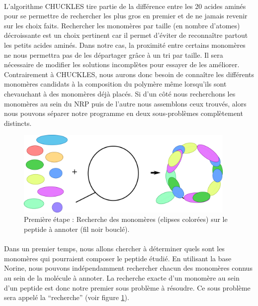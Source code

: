 \documentclass[12pt,french,twoside]{report}
\begin{document}
\paragraph{}L'algorithme CHUCKLES tire partie de la différence entre les 20 acides aminés pour se permettre de rechercher les plus gros en premier et de ne jamais revenir sur les choix faits.
Rechercher les monomères par taille (en nombre d'atomes) décroissante est un choix pertinent car il permet d'éviter de reconnaître partout les petits acides aminés.
Dans notre cas, la proximité entre certains monomères ne nous permettra pas de les départager grâce à un tri par taille.
Il sera nécessaire de modifier les solutions incomplètes pour essayer de les améliorer.
Contrairement à CHUCKLES, nous aurons donc besoin de connaître les différents monomères candidats à la composition du polymère même lorsqu'ils sont chevauchant à des monomères déjà placés.
Si d'un côté nous recherchons les monomères au sein du NRP puis de l'autre nous assemblons ceux trouvés, alors nous pouvons séparer notre programme en deux sous-problèmes complètement distincts.

\begin{figure}[!h]
  \begin{center}
    \includegraphics[width=400px]{Figures/s2m/Intro/searching.png}
    \caption{\label{search_fig}Première étape : Recherche des monomères (elipses colorées) sur le peptide à annoter (fil noir bouclé).}
  \end{center}
\end{figure}

\paragraph{}Dans un premier temps, nous allons chercher à déterminer quels sont les monomères qui pourraient composer le peptide étudié.
En utilisant la base Norine, nous pouvons indépendamment rechercher chacun des monomères connus au sein de la molécule à annoter.
La recherche exacte d'un monomère au sein d'un peptide est donc notre premier sous problème à résoudre.
Ce sous problème sera appelé la ``recherche'' (voir figure \ref{search_fig}).
\end{document}
